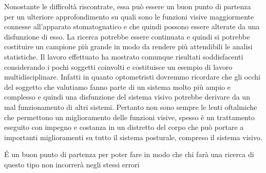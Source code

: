 Nonostante le difficoltà riscontrate, essa può essere un buon punto di partenza per un ulteriore approfondimento su quali sono le funzioni visive maggiormente connesse all’apparato stomatognatico e che quindi possono essere alterate da una disfunzione di esso. La ricerca potrebbe essere continuata e quindi si potrebbe costituire un campione più grande in modo da rendere più attendibili le analisi statistiche. Il lavoro effettuato ha mostrato comunque risultati soddisfacenti considerando i pochi soggetti coinvolti e costituisce un esempio di lavoro multidisciplinare. Infatti in quanto optometristi dovremmo ricordare che gli occhi del soggetto che valutiamo fanno parte di un sistema molto più ampio e complesso e quindi una disfunzione del sistema visivo potrebbe derivare da un mal funzionamento di altri sistemi. Pertanto non sono sempre le lenti oftalmiche che permettono un miglioramento delle funzioni visive, spesso è  un trattamento eseguito con impegno e costanza in un distretto del corpo che può portare a importanti miglioramenti su tutto il sistema posturale, compreso il sistema visivo.

É un buon punto di partenza per poter fare in modo che chi farà una ricerca di questo tipo non incorrerà negli stessi errori